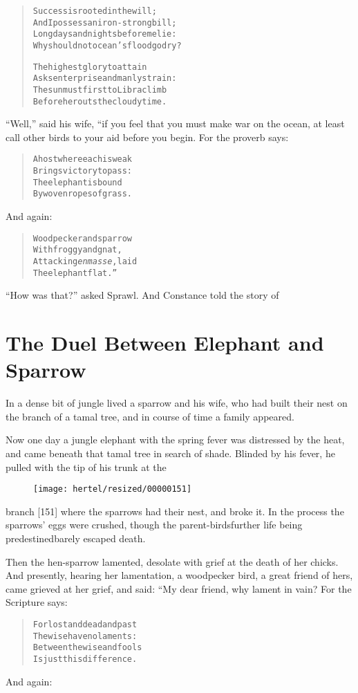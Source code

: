 \documentclass[article, twoside, 10pt]{memoir}
\renewenvironment{verbatim}{%
\begin{quote}%
\vskip -10pt%
\begin{alltt}\normalfont\small}{\end{alltt}%
\end{quote}%
\vskip -10pt
} %
\begin{document}
\begin{verbatim}
Success is rooted in the will;
And I possess an iron-strong bill;
Long days and nights before me lie:
Why should not ocean's flood go dry?

The highest glory to attain
Asks enterprise and manly strain:
The sun must first to Libra climb
Before he routs the cloudy time.
\end{verbatim}
``Well,'' said his wife, “if you feel that you must make war on the
ocean, at least call other birds to your aid before you begin. For
the proverb says:

\begin{verbatim}
A host where each is weak
    Brings victory to pass:
The elephant is bound
    By woven ropes of grass.
\end{verbatim}
And again:

\begin{verbatim}
Woodpecker and sparrow
    With froggy and gnat,
Attacking \emph{en masse}, laid
    The elephant flat.”
\end{verbatim}
``How was that?'' asked Sprawl. And Constance told the story of

\chapter{The Duel Between Elephant and Sparrow}

In a dense bit of jungle lived a sparrow and his wife, who had
built their nest on the branch of a tamal tree, and in course of
time a family appeared.

Now one day a jungle elephant with the spring fever was distressed
by the heat, and came beneath that tamal tree in search of shade.
Blinded by his fever, he pulled with the tip of his trunk at the
\begin{figure}[p]\texttt{[image: hertel/resized/00000151]}\end{figure}branch [151] where the sparrows had their nest, and broke it. In
the process the sparrows' eggs were crushed, though the
parent-birds{\textemdash}further life being predestined{\textemdash}barely escaped
death.

Then the hen-sparrow lamented, desolate with grief at the death of
her chicks. And presently, hearing her lamentation, a woodpecker
bird, a great friend of hers, came grieved at her grief, and said:
“My dear friend, why lament in vain? For the Scripture says:

\begin{verbatim}
For lost and dead and past
    The wise have no laments:
Between the wise and fools
    Is just this difference.
\end{verbatim}
And again:
\end{document}
